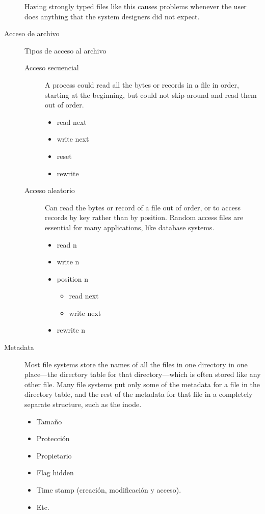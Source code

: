 \documentclass[a4paper, twoside]{article}
\begin{document}
\begin{description}
	Having strongly typed files like this causes problems whenever the user does anything that the system designers did not expect.
	
	\item[Acceso de archivo] Tipos de acceso al archivo
	\begin{description}
		\item[Acceso secuencial] A process could read all the bytes or records in a file in order, starting at the beginning, but could not skip around and read them out of order.
		\begin{itemize}
			\item read next
			\item write next
			\item reset
			\item rewrite
		\end{itemize}

		\item[Acceso aleatorio] Can read the bytes or record of a file out of order, or to access records by key rather than by position. Random access files are essential for many applications, like database systems.
		\begin{itemize}
			\item read n
			\item write n
			\item position n
			\begin{itemize}
				\item read next
				\item write next
			\end{itemize}
			\item rewrite n
		\end{itemize}
	\end{description}

	\item[Metadata] Most file systems store the names of all the files in one directory in one place—the directory table for that directory—which is often stored like any other file. Many file systems put only some of the metadata for a file in the directory table, and the rest of the metadata for that file in a completely separate structure, such as the inode.
	\begin{itemize}
		\item Tamaño
		\item Protección
		\item Propietario
		\item Flag hidden
		\item Time stamp (creación, modificación y acceso).
		\item Etc.
	\end{itemize}
\end{description}
\end{document}
